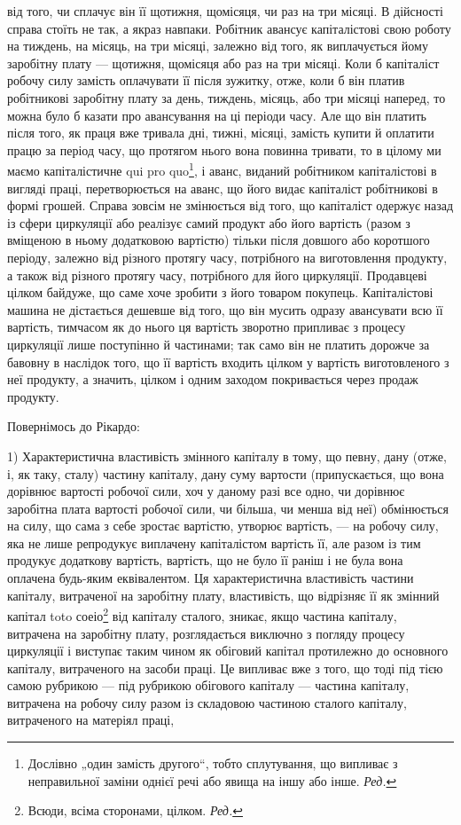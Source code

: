 \parcont{}  %
від того, чи сплачує він її щотижня, щомісяця, чи раз на три місяці.
В дійсності справа стоїть не так, а якраз навпаки. Робітник авансує
капіталістові свою роботу на тиждень, на місяць, на три місяці, залежно
від того, як виплачується йому заробітну плату — щотижня, щомісяця або
раз на три місяці. Коли б капіталіст  робочу силу замість
оплачувати її після зужитку, отже, коли б він платив робітникові заробітну
плату за день, тиждень, місяць, або три місяці наперед, то можна
було б казати про авансування на ці періоди часу. Але що він платить
після того, як праця вже тривала дні, тижні, місяці, замість купити й
оплатити працю за період часу, що протягом нього вона повинна тривати,
то в цілому ми маємо капіталістичне qui pro quo\footnote*{
Дослівно „один замість другого“, тобто сплутування, що
випливає з неправильної заміни однієї речі або явища на іншу або інше. \emph{Ред.}
}, і аванс, виданий
робітником капіталістові в вигляді праці, перетворюється на аванс, що
його видає капіталіст робітникові в формі грошей. Справа зовсім не змінюється
від того, що капіталіст одержує назад із сфери циркуляції або
реалізує самий продукт або його вартість (разом з вміщеною в ньому
додатковою вартістю) тільки після довшого або коротшого періоду, залежно
від різного протягу часу, потрібного на виготовлення продукту,
а також від різного протягу часу, потрібного для його циркуляції. Продавцеві
цілком байдуже, що саме хоче зробити з його товаром покупець.
Капіталістові машина не дістається дешевше від того, що він мусить
одразу авансувати всю її вартість, тимчасом як до нього ця вартість
зворотно припливає з процесу циркуляції лише поступінно й частинами;
так само він не платить дорожче за бавовну в наслідок того, що її
вартість входить цілком у вартість виготовленого з неї продукту, а
значить, цілком і одним заходом покривається через продаж продукту.

Повернімось до Рікардо:

\vtyagnut{}
1) Характеристична властивість змінного капіталу в тому, що певну,
дану (отже, і, як таку, сталу) частину капіталу, дану суму вартости
(припускається, що вона дорівнює вартості робочої сили, хоч у даному
разі все одно, чи дорівнює заробітна плата вартості робочої сили, чи
більша, чи менша від неї) обмінюється на силу, що сама з себе
зростає вартістю, утворює вартість, — на робочу силу, яка не лише репродукує
виплачену капіталістом вартість її, але разом із тим продукує
додаткову вартість, вартість, що не було її раніш і не була вона
оплачена будь-яким еквівалентом. Ця характеристична властивість частини
капіталу, витраченої на заробітну плату, властивість, що відрізняє її як
змінний капітал toto соеіо\footnote*{
Всюди, всіма сторонами, цілком. \emph{Ред.}
} від капіталу сталого, зникає, якщо частина
капіталу, витрачена на заробітну плату, розглядається виключно з погляду
процесу циркуляції і виступає таким чином як обіговий капітал
протилежно до основного капіталу, витраченого на засоби праці. Це
випливає вже з того, що тоді під тією самою рубрикою — під рубрикою
обігового капіталу — частина капіталу, витрачена на робочу силу разом із
складовою частиною сталого капіталу, витраченого на матеріял праці,
\parbreak{}  %
